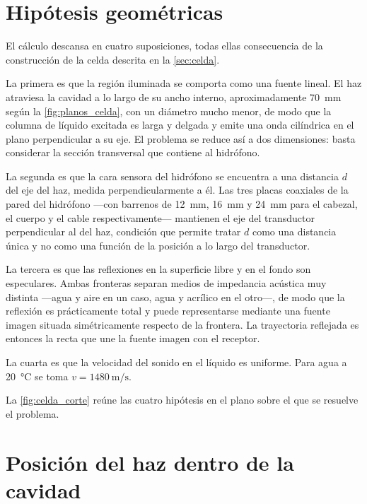 \section*{Hipótesis geométricas}

El cálculo descansa en cuatro suposiciones, todas ellas consecuencia de
la construcción de la celda descrita en la \cref{sec:celda}.

La primera es que la región iluminada se comporta como una fuente
lineal. El haz atraviesa la cavidad a lo largo de su ancho interno,
aproximadamente \SI{70}{\milli\meter} según la \cref{fig:planos_celda},
con un diámetro mucho menor, de
modo que la columna de líquido excitada es larga y delgada y emite una
onda cilíndrica en el plano perpendicular a su eje. El problema se
reduce así a dos dimensiones: basta considerar la sección transversal
que contiene al hidrófono.

La segunda es que la cara sensora del hidrófono se encuentra a una
distancia $d$ del eje del haz, medida perpendicularmente a él. Las tres
placas coaxiales de la pared del hidrófono ---con barrenos de
\SI{12}{\milli\meter}, \SI{16}{\milli\meter} y \SI{24}{\milli\meter}
para el cabezal, el cuerpo y el cable respectivamente--- mantienen el
eje del transductor perpendicular al del haz, condición que permite
tratar $d$ como una distancia única y no como una función de la
posición a lo largo del transductor.

La tercera es que las reflexiones en la superficie libre y en el fondo
son especulares. Ambas fronteras separan medios de impedancia acústica
muy distinta ---agua y aire en un caso, agua y acrílico en el otro---,
de modo que la reflexión es prácticamente total y puede representarse
mediante una fuente imagen situada simétricamente respecto de la
frontera. La trayectoria reflejada es entonces la recta que une la
fuente imagen con el receptor.

La cuarta es que la velocidad del sonido en el líquido es uniforme.
Para agua a \SI{20}{\celsius} se toma
$v = \SI{1480}{\meter\per\second}$.

La \cref{fig:celda_corte} reúne las cuatro hipótesis en el plano sobre
el que se resuelve el problema.



\section*{Posición del haz dentro de la cavidad}

